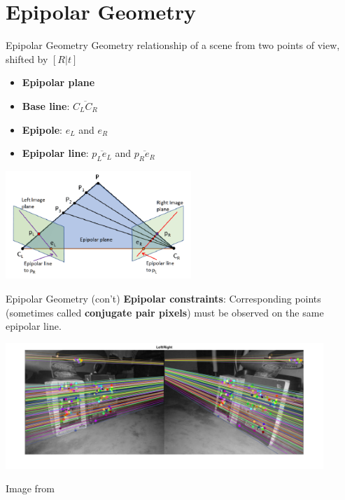 \documentclass{beamer}
\begin{document}
\section{Epipolar Geometry}
\begin{frame}{Epipolar Geometry}
    Geometry relationship of a scene from two points of view, shifted by $[R \lvert t]$
    \begin{itemize}
        \item \textbf{Epipolar plane}
        \item \textbf{Base line}: $\overline{C_LC_R}$
        \item \textbf{Epipole}: $e_L$ and $e_R$
        \item \textbf{Epipolar line}: $\overline{p_Le_L}$ and $\overline{p_Re_R}$
    \end{itemize}
    \begin{center}
        \includegraphics[width=7cm]{epipolar.JPG}
    \end{center}
\end{frame}

\begin{frame}{Epipolar Geometry (con't)}
    \textbf{Epipolar constraints}: Corresponding points (sometimes called \textbf{conjugate pair pixels}) must be observed on the same epipolar line.
    \begin{center}
        \includegraphics[width=12cm]{epipolar_demo1.png}
        \par Image from \cite{noauthor_epipolar_2017}
    \end{center}
\end{frame}
\end{document}
